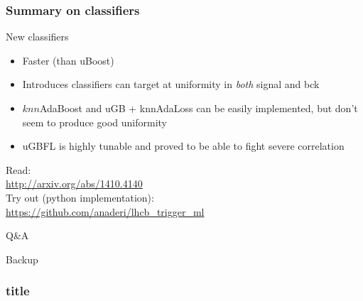 \documentclass{beamer}
\begin{document}
\begin{frame}[t]
    \frametitle{Summary on classifiers}
    New classifiers
    \begin{itemize}
        \item Faster (than uBoost)
        \item Introduces classifiers can target at uniformity in \textit{both} signal and bck
        \item $knn$AdaBoost and uGB + knnAdaLoss can be easily implemented, but don't seem to produce good uniformity
        \item uGBFL is highly tunable and proved to be able to fight severe correlation
    \end{itemize}

\end{frame}

\begin{frame}

    Read: \\
    \url{http://arxiv.org/abs/1410.4140} 
    \bigskip
    \\

    Try out (python implementation): \\
    \url{https://github.com/anaderi/lhcb_trigger_ml}

\end{frame}



\begin{frame}
\Huge{\centerline{Q\&A}}
\end{frame}


\begin{frame}
    \Huge{\centerline{Backup}}
\end{frame}

\begin{frame}[t]
    \frametitle{title}
    


\end{frame}


% 
\end{document}
